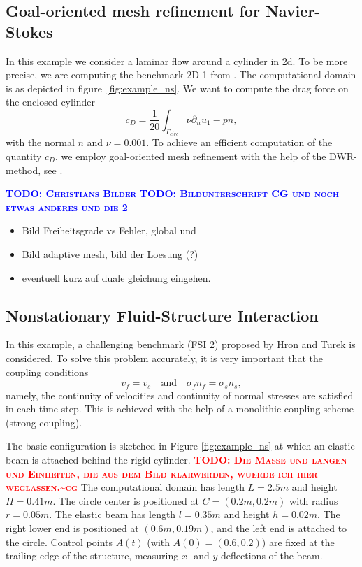 \documentclass[prodmode,acmtoms]{acmsmall}
\numberwithin{equation}{section}
\newcommand{\todo}[1]{\textbf{\textsc{\textcolor{blue}{TODO: #1}}}}
\newcommand{\todocg}[1]{\textbf{\textsc{\textcolor{red}{TODO: #1\textasciitilde cg}}}}
\begin{document}
\subsection{Goal-oriented mesh refinement for Navier-Stokes}
In this example we consider a laminar flow around a cylinder in 2d. To be more precise, we are computing the benchmark 2D-1 from \cite{TuSchae96}. The computational domain is as depicted in figure~\ref{fig:example_ns}. We want to compute the drag force on the enclosed cylinder
\begin{equation}
c_D = \frac 1 {20} \int_{\Gamma_{circ}} \nu\partial_nu _1 - pn,
\end{equation}
with the normal $n$ and $\nu = 0.001$. To achieve an efficient computation of the quantity $c_D$, we employ goal-oriented mesh refinement with the help of the DWR-method, see \cite{BeRa96}.

\todo{Christians Bilder}
\todo{Bildunterschrift CG und noch etwas anderes und die 2}
\begin{itemize}
\item Bild Freiheitsgrade vs Fehler, global und 
\item Bild adaptive mesh, bild der Loesung (?)
\item eventuell kurz auf duale gleichung eingehen.
\end{itemize}

\subsection{Nonstationary Fluid-Structure Interaction}
In this example, a challenging benchmark (FSI 2)
proposed by Hron and Turek \cite{HrTu06b} is considered.
To solve this problem accurately, it is very important that 
the coupling conditions
\[
v_f = v_s \quad \text{and} \quad \sigma_f n_f = \sigma_s n_s, 
\]
namely, the continuity of velocities and continuity of normal stresses
are satisfied in each time-step. This is achieved with the help of 
a monolithic coupling scheme (strong coupling).

The basic configuration is 
sketched in Figure \ref{fig:example_ns} at which an elastic beam is attached 
behind the rigid cylinder. 
\todocg{Die Masse und langen und Einheiten, die aus dem Bild klarwerden, wuerde ich hier weglassen.}
The computational domain has length $L=2.5m$ and height $H=0.41m$. The circle center
is positioned at $C=(0.2m,0.2m)$ with radius $r=0.05m$. The elastic beam has length
$l=0.35m$ and height $h=0.02m$. The right lower end is positioned at 
$(0.6m,0.19m)$, and
the left end is attached to the circle. 
Control points $A(t)$ (with $A(0) = (0.6,0.2)$) are fixed at the 
trailing edge of the structure, measuring $x$- and $y$-deflections of the beam.
\end{document}
